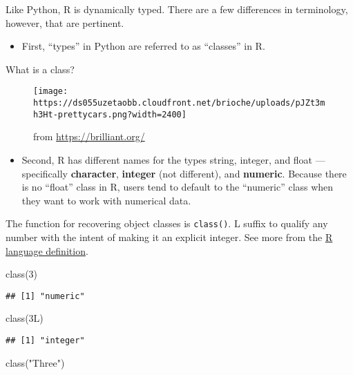 \documentclass[
]{book}
\newenvironment{Shaded}{\begin{snugshade}}{\end{snugshade}}
\newcommand{\DecValTok}[1]{\textcolor[rgb]{0.00,0.00,0.81}{#1}}
\newcommand{\FunctionTok}[1]{\textcolor[rgb]{0.00,0.00,0.00}{#1}}
\newcommand{\NormalTok}[1]{#1}
\newcommand{\StringTok}[1]{\textcolor[rgb]{0.31,0.60,0.02}{#1}}
\providecommand{\tightlist}{%
  \setlength{\itemsep}{0pt}\setlength{\parskip}{0pt}}
\begin{document}
Like Python, R is dynamically typed. There are a few differences in terminology, however, that are pertinent.

\begin{itemize}
\tightlist
\item
  First, ``types'' in Python are referred to as ``classes'' in R.
\end{itemize}

What is a class?

\begin{figure}
\centering
\texttt{[image: https://ds055uzetaobb.cloudfront.net/brioche/uploads/pJZt3mh3Ht-prettycars.png?width=2400]}
\caption{from \url{https://brilliant.org/}}
\end{figure}

\begin{itemize}
\tightlist
\item
  Second, R has different names for the types string, integer, and float --- specifically \textbf{character}, \textbf{integer} (not different), and \textbf{numeric}. Because there is no ``float'' class in R, users tend to default to the ``numeric'' class when they want to work with numerical data.
\end{itemize}

The function for recovering object classes is \texttt{class()}. L suffix to qualify any number with the intent of making it an explicit integer. See more from the \href{https://cran.r-project.org/doc/manuals/R-lang.html}{R language definition}.

\begin{Shaded}
\begin{Highlighting}[]
\FunctionTok{class}\NormalTok{(}\DecValTok{3}\NormalTok{)}
\end{Highlighting}
\end{Shaded}

\begin{verbatim}
## [1] "numeric"
\end{verbatim}

\begin{Shaded}
\begin{Highlighting}[]
\FunctionTok{class}\NormalTok{(3L)}
\end{Highlighting}
\end{Shaded}

\begin{verbatim}
## [1] "integer"
\end{verbatim}

\begin{Shaded}
\begin{Highlighting}[]
\FunctionTok{class}\NormalTok{(}\StringTok{"Three"}\NormalTok{)}
\end{Highlighting}
\end{Shaded}
\end{document}
